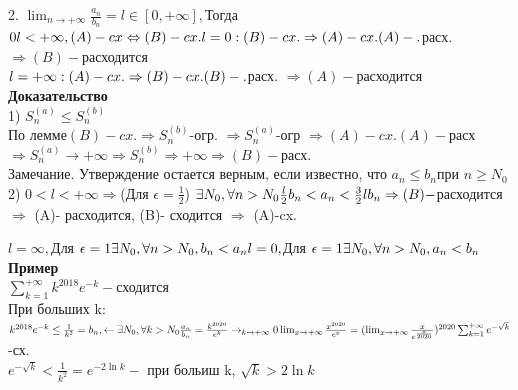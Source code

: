 \documentclass[12pt, a4paper]{article}
\begin{document}
	2. $ \lim_{n \rightarrow +\infty} \frac{a_n}{b_n}= l \in [0,+\infty], $Тогда
	$ 0 l < +\infty, (A)- cx \Leftrightarrow (B)- cx. \\
	l=0 : (B)-cx. \Rightarrow(A)- cx. \\
	(A)-.$расх. $ \Rightarrow (B) - $расходится\\
	$	l=+\infty : (A)-cx. \Rightarrow(B)- cx. \\
	(B)-.$расх. $ \Rightarrow (A) - $расходится\\
	\textbf{Доказательство}\\
	1) $ S_n^{(a)} \leq S_n^{(b)} $\\
	По лемме$(B) - cx. \Rightarrow  S_n^{(b)}$-огр. $ \Rightarrow S_n^{(a)} $-огр $ \Rightarrow (A) -cx. 
	(A)-$расх$ \Rightarrow S_n^{(a)} \rightarrow +\infty \Rightarrow S_n^{(b)} \Rightarrow +\infty \Rightarrow (B) -$расх. \\
	Замечание.  Утверждение остается верным, если известно, что $ a_n \leq b_n $при $ n \geq N_0 $
	2) $ 0 < l < +\infty \Rightarrow  $(Для $ \epsilon = \frac{1}{2} $) $ \exists N_0, \forall n > N_0 \\
	\frac{l}{2} b_n < a_n < \frac{3}{2} l b_n \\
	\Rightarrow  (B) - $расходится  $\Rightarrow$ (A)- расходится, (B)- сходится $ \Rightarrow $ (A)-cx. 
	
	$ l =\infty , $Для $ \epsilon =1 \exists N_0, \forall n > N_0 , b_n<a_n \\
	l =0 , $Для $ \epsilon =1 \exists N_0, \forall n > N_0 , a_n<b_n  \\$
	\textbf{Пример}\\
	$ \sum_{k=1}^{+\infty} k^{2018} e^{-k} - $сходится \\
	При больших k: $ k^{2018} e^{-k} \leq \frac{1}{k^2} =b_n,\leftarrow \exists N_0, \forall k > N_0 \\
	\frac{a_n}{b_n} = \frac{k^{2020}}{e^k} \rightarrow_{k \rightarrow + \infty} 0 \\
	\lim_{x \rightarrow + \infty} \frac{x^{2020}}{e^x} = (\lim_{x \rightarrow +\infty} \frac{x}{e^{\frac{x}{2020}}})^{2020} \\
	\sum_{k=1}^{+\infty} e^{- \sqrt{k}}$ -сх. \\
	$ e^{-\sqrt{k}}< \frac{1}{k^2} = e^{-2 \ln k} - $ при больиш k, $ \sqrt{k} > 2 \ln k $
\end{document}

